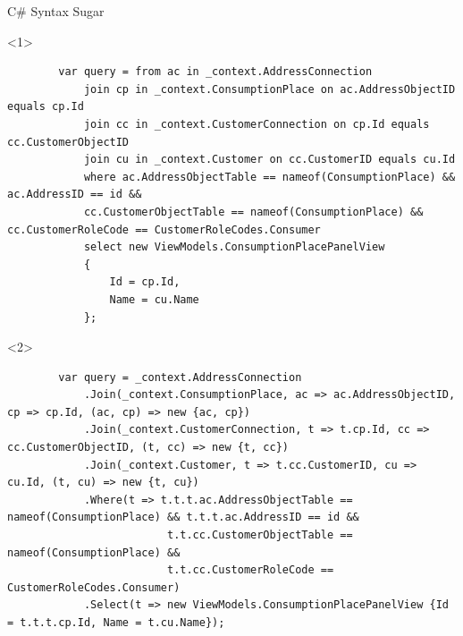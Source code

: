 \documentclass{bredelebeamer}
\begin{document}
\begin{frame}[fragile]{C\# Syntax Sugar}
    \begin{onlyenv}<1>
        \begin{lstlisting}
        var query = from ac in _context.AddressConnection
            join cp in _context.ConsumptionPlace on ac.AddressObjectID equals cp.Id
            join cc in _context.CustomerConnection on cp.Id equals cc.CustomerObjectID
            join cu in _context.Customer on cc.CustomerID equals cu.Id
            where ac.AddressObjectTable == nameof(ConsumptionPlace) && ac.AddressID == id &&
            cc.CustomerObjectTable == nameof(ConsumptionPlace) && cc.CustomerRoleCode == CustomerRoleCodes.Consumer
            select new ViewModels.ConsumptionPlacePanelView
            {
                Id = cp.Id,
                Name = cu.Name
            };
        \end{lstlisting}
    \end{onlyenv}
    \begin{onlyenv}<2>
        \begin{lstlisting}
        var query = _context.AddressConnection
            .Join(_context.ConsumptionPlace, ac => ac.AddressObjectID, cp => cp.Id, (ac, cp) => new {ac, cp})
            .Join(_context.CustomerConnection, t => t.cp.Id, cc => cc.CustomerObjectID, (t, cc) => new {t, cc})
            .Join(_context.Customer, t => t.cc.CustomerID, cu => cu.Id, (t, cu) => new {t, cu})
            .Where(t => t.t.t.ac.AddressObjectTable == nameof(ConsumptionPlace) && t.t.t.ac.AddressID == id &&
                         t.t.cc.CustomerObjectTable == nameof(ConsumptionPlace) &&
                         t.t.cc.CustomerRoleCode == CustomerRoleCodes.Consumer)
            .Select(t => new ViewModels.ConsumptionPlacePanelView {Id = t.t.t.cp.Id, Name = t.cu.Name});
        \end{lstlisting}
    \end{onlyenv}
\end{frame}
\end{document}
